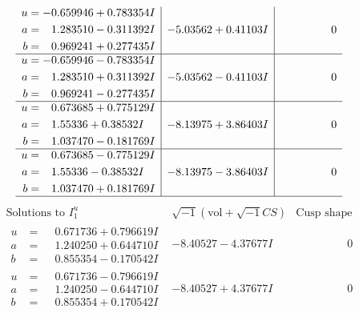 \documentclass[1p]{elsarticle_modified}
\theoremstyle{definition}
\newcommand{\I}{\sqrt{-1}}
\begin{document}
$$\begin{array}{c|c|c}
\begin{aligned}
u &= -0.659946 + 0.783354 I \\
a &= \phantom{-}1.283510 - 0.311392 I \\
b &= \phantom{-}0.969241 + 0.277435 I\end{aligned}
 & -5.03562 + 0.41103 I & \phantom{-0.000000 } 0 \\ \hline\begin{aligned}
u &= -0.659946 - 0.783354 I \\
a &= \phantom{-}1.283510 + 0.311392 I \\
b &= \phantom{-}0.969241 - 0.277435 I\end{aligned}
 & -5.03562 - 0.41103 I & \phantom{-0.000000 } 0 \\ \hline\begin{aligned}
u &= \phantom{-}0.673685 + 0.775129 I \\
a &= \phantom{-}1.55336 + 0.38532 I \\
b &= \phantom{-}1.037470 - 0.181769 I\end{aligned}
 & -8.13975 + 3.86403 I & \phantom{-0.000000 } 0 \\ \hline\begin{aligned}
u &= \phantom{-}0.673685 - 0.775129 I \\
a &= \phantom{-}1.55336 - 0.38532 I \\
b &= \phantom{-}1.037470 + 0.181769 I\end{aligned}
 & -8.13975 - 3.86403 I & \phantom{-0.000000 } 0\\
 \hline 
 \end{array}$$\newpage$$\begin{array}{c|c|c}  
\text{Solutions to }I^u_{1}& \I (\text{vol} + \sqrt{-1}CS) & \text{Cusp shape}\\
 \hline 
\begin{aligned}
u &= \phantom{-}0.671736 + 0.796619 I \\
a &= \phantom{-}1.240250 + 0.644710 I \\
b &= \phantom{-}0.855354 - 0.170542 I\end{aligned}
 & -8.40527 - 4.37677 I & \phantom{-0.000000 } 0 \\ \hline\begin{aligned}
u &= \phantom{-}0.671736 - 0.796619 I \\
a &= \phantom{-}1.240250 - 0.644710 I \\
b &= \phantom{-}0.855354 + 0.170542 I\end{aligned}
 & -8.40527 + 4.37677 I & \phantom{-0.000000 } 0 \\ \hline\begin{aligned}

\end{aligned}
\end{array}$$
\end{document}
